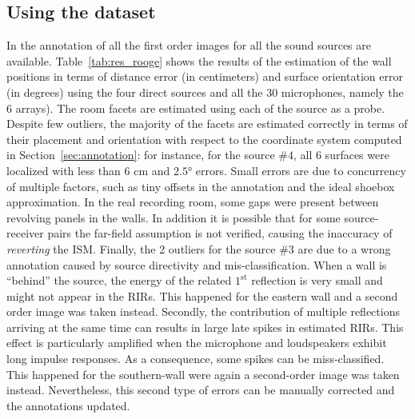 \subsection{Using the \dEchorate{} dataset}
In \dEchorate{} the annotation of all the first order images for all the sound sources are available.
Table~\ref{tab:res_rooge} shows the results of the estimation of the wall positions in terms of distance error (in centimeters) and surface orientation error (in degrees) using the four direct sources and all the 30 microphones, namely the 6 arrays).
The room facets are estimated using each of the source as a probe. Despite few outliers, the majority of the facets are estimated correctly in terms of their placement and orientation with respect to the coordinate system computed in Section~\ref{sec:annotation}: for instance, for the source $\#4$, all 6 surfaces were localized with less than $6$ cm and $\ang{2.5}$ errors. Small errors are due to concurrency of multiple factors, such as tiny offsets in the annotation and the ideal shoebox approximation. In the real recording room, some gaps were present between revolving panels in the walls. In addition it is possible that for some source-receiver pairs the far-field assumption is not verified, causing the inaccuracy of \textit{reverting} the ISM. Finally, the 2 outliers for the source $\#3$ are due to a wrong annotation caused by source directivity and mis-classification. When a wall is ``behind'' the source, the energy of the related $1^\text{st}$ reflection is very small and might not appear in the RIRs. This happened for the eastern wall and a second order image was taken instead. Secondly, the contribution of multiple reflections arriving at the same time can results in large late spikes in estimated RIRs. This effect is particularly amplified when the microphone and loudspeakers exhibit long impulse responses. As a consequence, some spikes can be miss-classified. This happened for the southern-wall were again a second-order image was taken instead. Nevertheless, this second type of errors can be manually corrected and the annotations updated.

